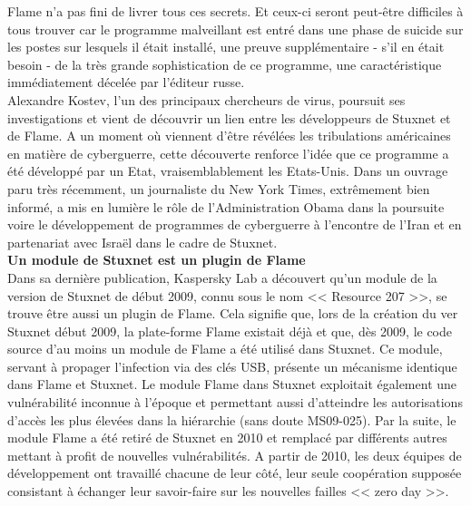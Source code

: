 \documentclass[11pt,twoside,a4paper]{article}
\begin{document}
Flame n'a pas fini de livrer tous ces secrets. Et ceux-ci seront peut-{\^e}tre difficiles {\`a} tous trouver car le programme malveillant est entr{\'e} dans une phase de suicide sur les postes sur lesquels il {\'e}tait install{\'e}, une preuve suppl{\'e}mentaire - s'il en {\'e}tait besoin -  de la tr{\`e}s grande sophistication de ce programme, une caract{\'e}ristique imm{\'e}diatement d{\'e}cel{\'e}e par l'{\'e}diteur russe.~\\

Alexandre Kostev, l'un des principaux chercheurs de virus, poursuit ses investigations et vient de d{\'e}couvrir un lien entre les d{\'e}veloppeurs de Stuxnet et de Flame. A un moment o{\`u} viennent d'{\^e}tre r{\'e}v{\'e}l{\'e}es les tribulations am{\'e}ricaines en mati{\`e}re de cyberguerre, cette d{\'e}couverte renforce l'id{\'e}e que ce programme a {\'e}t{\'e} d{\'e}velopp{\'e} par un Etat, vraisemblablement les Etats-Unis.  Dans un ouvrage paru tr{\`e}s r{\'e}cemment, un journaliste du New York Times, extr{\^e}mement bien inform{\'e}, a mis en lumi{\`e}re le r{\^o}le de l'Administration Obama dans la poursuite voire le d{\'e}veloppement de programmes de cyberguerre {\`a} l'encontre de l'Iran et en partenariat avec Isra{\"e}l dans le cadre de Stuxnet.~\\

\textbf{\large Un module de Stuxnet est un plugin de Flame}~\\

Dans sa derni{\`e}re publication, Kaspersky Lab a d{\'e}couvert qu'un module de la version de Stuxnet de d{\'e}but 2009, connu sous le nom << Resource 207 >>, se trouve {\^e}tre aussi un plugin de Flame. Cela signifie que, lors de la cr{\'e}ation du ver Stuxnet d{\'e}but 2009, la plate-forme Flame existait d{\'e}j{\`a} et que, d{\`e}s 2009, le code source d'au moins un module de Flame a {\'e}t{\'e} utilis{\'e} dans Stuxnet. Ce module, servant {\`a} propager l'infection via des cl{\'e}s USB, pr{\'e}sente un m{\'e}canisme identique dans Flame et Stuxnet. Le module Flame dans Stuxnet exploitait {\'e}galement une vuln{\'e}rabilit{\'e} inconnue {\`a} l'{\'e}poque et permettant aussi d'atteindre les autorisations d'acc{\`e}s les plus {\'e}lev{\'e}es dans la hi{\'e}rarchie (sans doute MS09-025). Par la suite, le module Flame a {\'e}t{\'e} retir{\'e} de Stuxnet en 2010 et remplac{\'e} par diff{\'e}rents autres mettant {\`a} profit de nouvelles vuln{\'e}rabilit{\'e}s. A partir de 2010, les deux {\'e}quipes de d{\'e}veloppement ont travaill{\'e} chacune de leur c{\^o}t{\'e}, leur seule coop{\'e}ration suppos{\'e}e consistant {\`a} {\'e}changer leur savoir-faire sur les nouvelles failles << zero day >>.~\\ 
\end{document}
